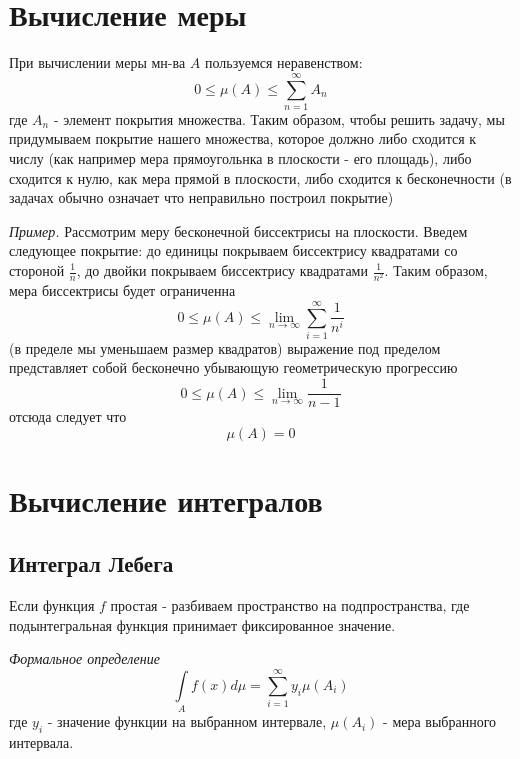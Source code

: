 \documentclass{article}[12pt]
\begin{document}
\section{Вычисление меры}
При вычислении меры мн-ва $A$ пользуемся неравенством:
\begin{displaymath}
    0 \leqslant \mu(A) \leqslant \sum\limits_{n=1}^{\infty}A_{n}
\end{displaymath}
где $A_{n}$ - элемент покрытия множества. Таким образом, чтобы решить
задачу, мы придумываем покрытие нашего множества, которое должно либо
сходится к числу (как например мера прямоугольнка в плоскости - его
площадь), либо сходится к нулю, как мера прямой в плоскости, либо
сходится к бесконечности (в задачах обычно означает что неправильно
построил покрытие)
\par \textit{Пример.} Рассмотрим меру бесконечной биссектрисы на
плоскости. Введем следующее покрытие: до единицы покрываем биссектрису
квадратами со стороной $\frac{1}{n}$, до двойки покрываем биссектрису
квадратами $\frac{1}{n^{2}}$. Таким образом, мера биссектрисы будет
ограниченна
\begin{displaymath}
    0 \leqslant \mu(A) \leqslant
    \lim\limits_{n\rightarrow \infty}\sum\limits_{i=1}^{\infty}\frac{1}{n^{i}}
\end{displaymath}
(в пределе мы уменьшаем размер квадратов) выражение под пределом представляет
собой бесконечно убывающую геометрическую прогрессию
\begin{displaymath}
    0 \leqslant \mu(A) \leqslant \lim\limits_{n\rightarrow
    \infty}\frac{1}{n-1}
\end{displaymath}
отсюда следует что
\begin{displaymath}
    \mu(A)=0
\end{displaymath}

\section{Вычисление интегралов}
\subsection{Интеграл Лебега}
Если функция $f$ простая - разбиваем пространство на подпространства,
где подынтегральная функция принимает фиксированное значение.

\par \textit{Формальное определение}
\begin{displaymath}
    \int\limits_{A}f(x)d\mu=\sum\limits_{i=1}^{\infty}y_{i}\mu(A_{i})
\end{displaymath}
где $y_{i}$ - значение функции на выбранном интервале, $\mu(A_{i})$ -
мера выбранного интервала.
\end{document}

